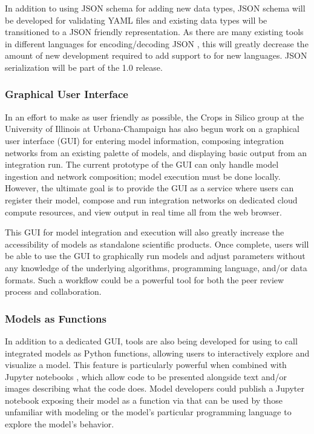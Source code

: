 \documentclass[journal]{IEEEtran}
\newcommand{\todo}[1]{{\color{red}{#1}}}
\newcommand{\pkg}{{\tt \todo{cis\_interface}}{}}
\begin{document}
In addition to using JSON schema for adding new data types, JSON schema will be developed for validating YAML files and existing data types will be transitioned to a JSON friendly representation. As there are many existing tools in different languages for encoding/decoding JSON \citep[e.g. FSON, jsonlite,][]{Levin2019,Ooms2014}, this will greatly decrease the amount of new development required to add support to {\pkg} for new languages.
%
JSON serialization will be part of the {\pkg} 1.0 release.

\subsubsection{Graphical User Interface}\label{SS:gui}
%
In an effort to make {\pkg} as user friendly as possible, the Crops in Silico group at the University of Illinois at Urbana-Champaign has also begun work on a graphical user interface (GUI) for entering model information, composing integration networks from an existing palette of models, and displaying basic output from an integration run. The current prototype of the GUI can only handle model ingestion and network composition; model execution must be done locally. However, the ultimate goal is to provide the GUI as a service where users can register their model, compose and run integration networks on dedicated cloud compute resources, and view output in real time all from the web browser. 

This GUI for model integration and execution will also greatly increase the accessibility of models as standalone scientific products. Once complete, users will be able to use the GUI to graphically run models and adjust parameters without any knowledge of the underlying algorithms, programming language, and/or data formats. Such a workflow could be a powerful tool for both the peer review process and collaboration.


\subsubsection{Models as Functions}\label{SS:function}
%
In addition to a dedicated GUI, tools are also being developed for using {\pkg} to call integrated models as Python functions, allowing users to interactively explore and visualize a model. This feature is particularly powerful when combined with Jupyter notebooks \citep{Kluyver2016}, which allow code to be presented alongside text and/or images describing what the code does. Model developers could publish a Jupyter notebook exposing their model as a function via {\pkg} that can be used by those unfamiliar with modeling or the model's particular programming language to explore the model's behavior. 
\end{document}

